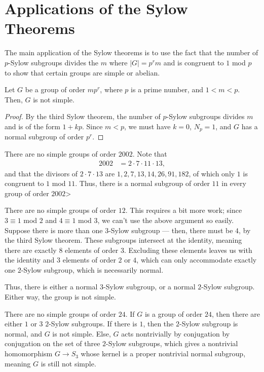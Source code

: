 \documentclass[10pt]{mypackage}
\begin{document}
\section{Applications of the Sylow Theorems}%
The main application of the Sylow theorems is to use the fact that the number of $p$-Sylow subgroups divides the $m$ where $\left\vert G \right\vert = p^{r}m$ and is congruent to $1$ mod $p$ to show that certain groups are simple or abelian.
\begin{claim}
  Let $G$ be a group of order $mp^{r}$, where $p$ is a prime number, and $1 < m < p$. Then, $G$ is not simple.
\end{claim}
\begin{proof}
  By the third Sylow theorem, the number of $p$-Sylow subgroups divides $m$ and is of the form $1 + kp$. Since $m < p$, we must have $k = 0$, $N_p = 1$, and $G$ has a normal subgroup of order $p^{r}$.
\end{proof}
\begin{example}
  There are no simple groups of order $2002$. Note that
  \begin{align*}
    2002 &= 2\cdot 7 \cdot 11 \cdot 13,
  \end{align*}
  and that the divisors of $2\cdot 7 \cdot 13$ are $1,2,7,13,14,26,91,182$, of which only $1$ is congruent to $1$ mod $11$. Thus, there is a normal subgroup of order $11$ in every group of order $2002$>
\end{example}
\begin{example}
  There are no simple groups of order $12$. This requires a bit more work; since $3\equiv 1$ mod $2$ and $4\equiv 1$ mod $3$, we can't use the above argument so easily. Suppose there is more than one $3$-Sylow subgroup --- then, there must be $4$, by the third Sylow theorem. These subgroups intersect at the identity, meaning there are exactly $8$ elements of order $3$. Excluding these elements leaves us with the identity and $3$ elements of order $2$ or $4$, which can only accommodate exactly one $2$-Sylow subgroup, which is necessarily normal.\newline

  Thus, there is either a normal $3$-Sylow subgroup, or a normal $2$-Sylow subgroup. Either way, the group is not simple.
\end{example}
\begin{example}
  There are no simple groups of order $24$. If $G$ is a group of order $24$, then there are either $1$ or $3$ $2$-Sylow subgroups. If there is $1$, then the $2$-Sylow subgroup is normal, and $G$ is not simple. Else, $G$ acts nontrivially by conjugation by conjugation on the set of three $2$-Sylow subgroups, which gives a nontrivial homomorphism $G\rightarrow S_3$ whose kernel is a proper nontrivial normal subgroup, meaning $G$ is still not simple.
\end{example}
\end{document}

